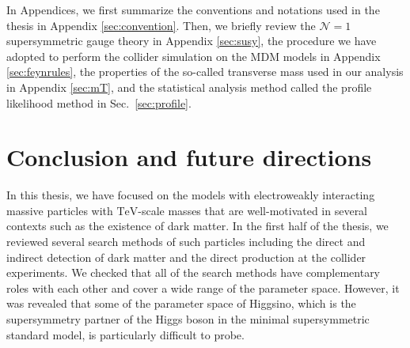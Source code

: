 \documentclass[12pt,twoside,book]{article}
\begin{document}
In Appendices, we first summarize the conventions and notations used in the thesis in Appendix \ref{sec:convention}.
Then, we briefly review the $\mathcal{N}=1$ supersymmetric gauge theory in Appendix \ref{sec:susy}, the procedure we have adopted to perform the collider simulation on the MDM models in Appendix \ref{sec:feynrules}, the properties of the so-called transverse mass used in our analysis in Appendix \ref{sec:mT}, and the statistical analysis method called the profile likelihood method in Sec.~\ref{sec:profile}.

\clearpage



\clearpage



\clearpage



\clearpage



\clearpage


\section[Conclusion and future directions]{Conclusion and future directions}
\setcounter{equation}{0}
\label{sec:conclusion}

\vskip 0.1in

In this thesis, we have focused on the models with electroweakly interacting massive particles with $\mathrm{TeV}$-scale masses that are well-motivated in several contexts such as the existence of dark matter.
In the first half of the thesis, we reviewed several search methods of such particles including the direct and indirect detection of dark matter and the direct production at the collider experiments.
We checked that all of the search methods have complementary roles with each other and cover a wide range of the parameter space.
However, it was revealed that some of the parameter space of Higgsino, which is the supersymmetry partner of the Higgs boson in the minimal supersymmetric standard model, is particularly difficult to probe.
\end{document}
